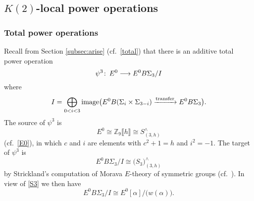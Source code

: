 \documentclass{gtpart}
\theoremstyle{definition}
\theoremstyle{remark}
\def\co{\colon\thinspace}
\newcommand{\mb}[1]{\mathbb{#1}}
\newcommand{\BZ}{{\mb Z}}
\newcommand{\A}{\alpha}
\newcommand{\p}{\psi^3}
\numberwithin{equation}{section}
\numberwithin{thm}{section}
\begin{document}
\subsection{$K(2)$-local power operations}
\label{subsec:K(2)po}

\subsubsection*{Total power operations}

Recall from Section \ref{subsec:arise} (cf.~\eqref{total}) that there is 
an additive total power operation 
\[
 \p \co E^0 \longrightarrow E^0 B\Sigma_3 / I 
\]
where 
\[
 I = \bigoplus_{0<i<3} {\rm image} 
 \big( E^0 B(\Sigma_i \times \Sigma_{3-i}) 
 \xrightarrow{\rm transfer} E^0 B\Sigma_3 \big).  
\]
The source of $\p$ is 
\[
 E^0 \cong \BZ_9 \llbracket h \rrbracket \cong S_{(3,h)}^\wedge 
\]
(cf.~\eqref{E0}), in which $c$ and $i$ are elements with $c^2 + 1 = h$ 
and $i^2 = -1$.  The target of $\p$ is 
\begin{equation}
\label{strickland}
 E^0 B\Sigma_3 / I \cong \big( S_3 \big)_{(3,h)}^\wedge 
\end{equation}
by Strickland's computation of Morava $E$-theory of symmetric groups 
(cf.~\cite[Theorem 1.1]{Str98}).  In view of \eqref{S3} we then have 
\begin{equation}
\label{strickland'}
 E^0 B\Sigma_3 / I \cong E^0 [\A] \big/ \big( w(\A) \big).  
\end{equation}
\end{document}
